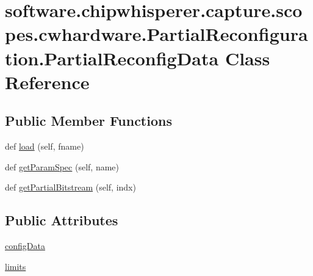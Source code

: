 \hypertarget{classsoftware_1_1chipwhisperer_1_1capture_1_1scopes_1_1cwhardware_1_1PartialReconfiguration_1_1PartialReconfigData}{}\section{software.\+chipwhisperer.\+capture.\+scopes.\+cwhardware.\+Partial\+Reconfiguration.\+Partial\+Reconfig\+Data Class Reference}
\label{classsoftware_1_1chipwhisperer_1_1capture_1_1scopes_1_1cwhardware_1_1PartialReconfiguration_1_1PartialReconfigData}
\subsection*{Public Member Functions}
\begin{DoxyCompactItemize}
\item 
def \hyperlink{classsoftware_1_1chipwhisperer_1_1capture_1_1scopes_1_1cwhardware_1_1PartialReconfiguration_1_1PartialReconfigData_a9933cd1b2ece67c1f7625e4c1642a5ec}{load} (self, fname)
\item 
def \hyperlink{classsoftware_1_1chipwhisperer_1_1capture_1_1scopes_1_1cwhardware_1_1PartialReconfiguration_1_1PartialReconfigData_a59c7eeba405ecbf864e45dbc53ed2a4f}{get\+Param\+Spec} (self, name)
\item 
def \hyperlink{classsoftware_1_1chipwhisperer_1_1capture_1_1scopes_1_1cwhardware_1_1PartialReconfiguration_1_1PartialReconfigData_a3fcb7dac3f9604204cf9d2febb0dad32}{get\+Partial\+Bitstream} (self, indx)
\end{DoxyCompactItemize}
\subsection*{Public Attributes}
\begin{DoxyCompactItemize}
\item 
\hyperlink{classsoftware_1_1chipwhisperer_1_1capture_1_1scopes_1_1cwhardware_1_1PartialReconfiguration_1_1PartialReconfigData_a09d36d1b33a0534808d7d63037d269db}{config\+Data}
\item 
\hyperlink{classsoftware_1_1chipwhisperer_1_1capture_1_1scopes_1_1cwhardware_1_1PartialReconfiguration_1_1PartialReconfigData_ab20943776795324dc652953f6ea63212}{limits}
\end{DoxyCompactItemize}


